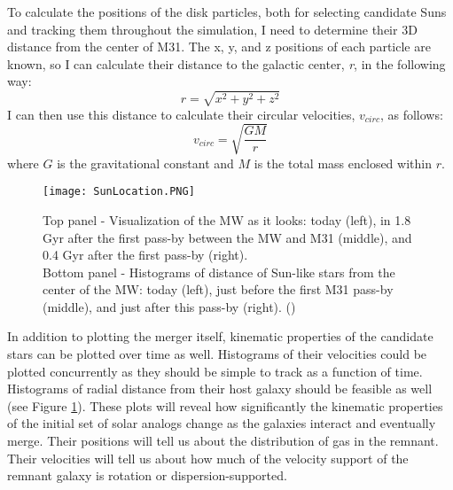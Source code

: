 \documentclass{aastex63}
\begin{document}
To calculate the positions of the disk particles, both for selecting candidate Suns and tracking them throughout the simulation, I need to determine their 3D distance from the center of M31. The x, y, and z positions of each particle are known, so I can calculate their distance to the galactic center, \textit{r}, in the following way:
\begin{equation}
    r = \sqrt{x^{2}+y^{2}+z^{2}}
\end{equation}
I can then use this distance to calculate their circular velocities, $v_{circ}$, as follows:
\begin{equation}
    v_{circ} = \sqrt{\frac{GM}{r}}
\end{equation}
where $G$ is the gravitational constant and $M$ is the total mass enclosed within $r$.

\begin{figure}[h!]
    \centering
    \texttt{[image: SunLocation.PNG]}
    \caption{Top panel - Visualization of the MW as it looks: today (left), in 1.8 Gyr after the first pass-by between the MW and M31 (middle), and 0.4 Gyr after the first pass-by (right).\\ Bottom panel - Histograms of distance of Sun-like stars from the center of the MW: today (left), just before the first M31 pass-by (middle), and just after this pass-by (right). (\cite{2008MNRAS.386..461C})}
    \label{fig:sunlocation}
\end{figure}

In addition to plotting the merger itself, kinematic properties of the candidate stars can be plotted over time as well. Histograms of their velocities could be plotted concurrently as they should be simple to track as a function of time. Histograms of radial distance from their host galaxy should be feasible as well (see Figure \ref{fig:sunlocation}). These plots will reveal how significantly the kinematic properties of the initial set of solar analogs change as the galaxies interact and eventually merge. Their positions will tell us about the distribution of gas in the remnant. Their velocities will tell us about how much of the velocity support of the remnant galaxy is rotation or dispersion-supported.
\end{document}
